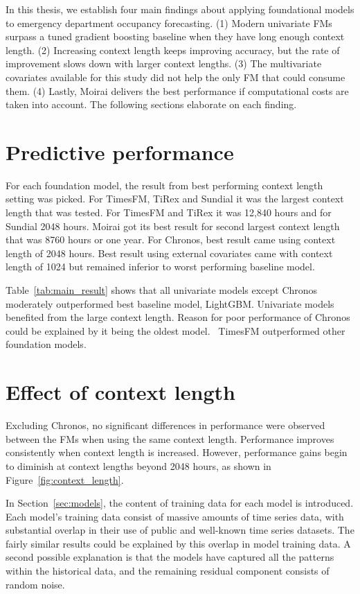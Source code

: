 In this thesis, we establish four main findings about applying foundational models to emergency department occupancy forecasting. (1) Modern univariate FMs surpass a tuned gradient boosting baseline when they have long enough context length.
(2) Increasing context length keeps improving accuracy, but the rate of improvement slows down with larger context lengths. (3) The multivariate covariates available for this study did not help the only FM that could consume them.
(4) Lastly, Moirai delivers the best performance if computational costs are taken into account. The following sections elaborate on each finding.

\section{Predictive performance}

For each foundation model, the result from best performing context length setting was picked. For TimesFM, TiRex and Sundial it was the largest context length that was tested. For TimesFM and TiRex it was 12,840 hours and for Sundial 2048 hours. Moirai got its best result for second largest context length that was 8760 hours or one year. For Chronos, best result came using context length of 2048 hours. Best result using external covariates came with context length of 1024 but remained inferior to worst performing baseline model.

Table~\ref{tab:main_result} shows that all univariate models except Chronos moderately outperformed best baseline model, LightGBM. Univariate models benefited from the large context length. Reason for poor performance of Chronos could be explained by it being the oldest model.~\cite{amazon_chronos_bolt_base} TimesFM outperformed other foundation models.



\section{Effect of context length}

Excluding Chronos, no significant differences in performance were observed between the FMs when using the same context length. Performance improves consistently when context length is increased. However, performance gains begin to diminish at context lengths beyond 2048 hours, as shown in Figure~\ref{fig:context_length}.

In Section~\ref{sec:models}, the content of training data for each model is introduced. Each model's training data consist of massive amounts of time series data, with substantial overlap in their use of public and well-known time series datasets. The fairly similar results could be explained by this overlap in model training data. A second possible explanation is that the models have captured all the patterns within the historical data, and the remaining residual component consists of random noise.

